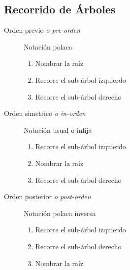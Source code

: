 \documentclass[a4paper,twocolumn]{article}
\numberwithin{equation}{section}
\numberwithin{figure}{section}
\numberwithin{table}{section}
\begin{document}
\subsection{Recorrido de \'Arboles}
\begin{description}
    \item[Orden previo \emph{o pre-orden}] Notaci\'on polaca
		\begin{enumerate}
      		\item Nombrar la ra\'iz
      		\item Recorre el sub-\'arbol izquierdo
            \item Recorre el sub-\'arbol derecho
    	\end{enumerate}
    \item[Orden simetrico \emph{o in-orden}] Notaci\'on usual o infija
		\begin{enumerate}
      		\item Recorre el sub-\'arbol izquierdo
            \item Nombrar la ra\'iz
            \item Recorre el sub-\'arbol derecho
    	\end{enumerate}
    \item[Orden posterior \emph{o post-orden}] Notaci\'on polaca inversa
		\begin{enumerate}
      		\item Recorre el sub-\'arbol izquierdo
            \item Recorre el sub-\'arbol derecho
            \item Nombrar la ra\'iz
    	\end{enumerate}
\end{description}
\end{document}
